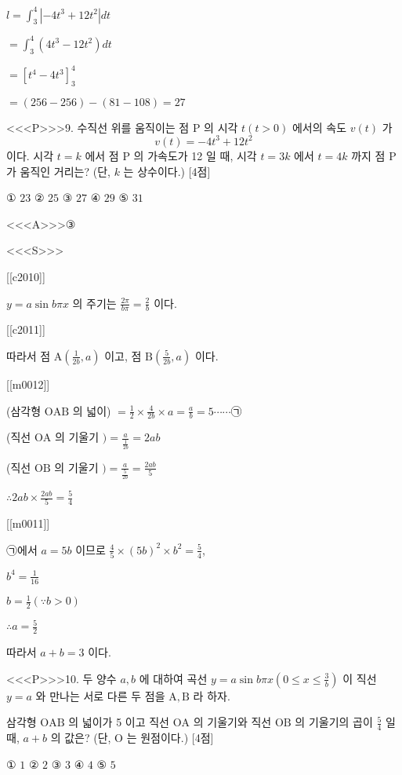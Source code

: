 \documentclass{oblivoir}
\begin{document}
$l =\int_{3}^{4}\left|-4 t^{3}+12 t^{2}\right| d t$

$=\int_{3}^{4}\left(4 t^{3}-12 t^{2}\right) d t$

$=\left[t^{4}-4 t^{3}\right]_{3}^{4}$

$=(256-256)-(81-108)=27$


<<<P>>>9. 수직선 위를 움직이는 점 $\mathrm{P}$ 의 시각 $t(t>0)$ 에서의 속도 $v(t)$ 가
$$
v(t)=-4 t^{3}+12 t^{2}
$$
이다. 시각 $t=k$ 에서 점 $\mathrm{P}$ 의 가속도가 12 일 때, 시각 $t=3 k$ 에서 $t=4 k$ 까지 점 $\mathrm{P}$ 가 움직인 거리는? (단, $k$ 는 상수이다.) [4점]

① $23$
② $25$
③ $27$
④ $29$
⑤ $31$

<<<A>>>③

<<<S>>>

[[c2010]]

$y=a \sin b \pi x$ 의 주기는 $\frac{2 \pi}{b \pi}=\frac{2}{b}$ 이다.

[[c2011]]

따라서 점 $\mathrm{A}\left(\frac{1}{2 b}, a\right)$ 이고, 점 $\mathrm{B}\left(\frac{5}{2 b}, a\right)$ 이다.

[[m0012]]

(삼각형 $\mathrm{OAB}$ 의 넓이) $=\frac{1}{2} \times \frac{4}{2 b} \times a=\frac{a}{b}=5\cdots\cdots$㉠

(직선 $\mathrm{OA}$ 의 기울기 $)=\frac{a}{\frac{1}{2 b}}=2 a b$

(직선 $\mathrm{OB}$ 의 기울기 $)=\frac{a}{\frac{5}{2 b}}=\frac{2 a b}{5}$

$\therefore 2 a b \times \frac{2 a b}{5}=\frac{5}{4}$

[[m0011]]

㉠에서 $a=5 b$ 이므로 $\frac{4}{5} \times(5 b)^{2} \times b^{2}=\frac{5}{4}$,

$b^{4}=\frac{1}{16}$

$b=\frac{1}{2}(\because b>0)$

$\therefore a=\frac{5}{2}$

따라서 $a+b=3$ 이다.


<<<P>>>10. 두 양수 $a, b$ 에 대하여 곡선 $y=a \sin b \pi x\left(0 \leq x \leq \frac{3}{b}\right)$ 이 직선 $y=a$ 와 만나는 서로 다른 두 점을 $\mathrm{A}, \mathrm{B}$ 라 하자.

삼각형 $\mathrm{OAB}$ 의 넓이가 5 이고 직선 $\mathrm{OA}$ 의 기울기와 직선 $\mathrm{OB}$ 의 기울기의 곱이 $\frac{5}{4}$ 일 때, $a+b$ 의 값은? (단, $\mathrm{O}$ 는 원점이다.) [4점]

① $1$
② $2$
③ $3$
④ $4$
⑤ $5$
\end{document}
